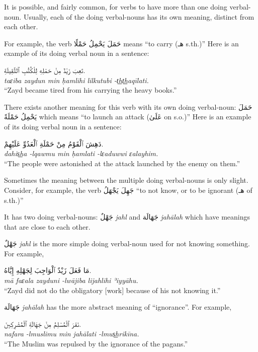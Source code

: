 \documentclass[
  10pt,
]{book}
\begin{document}
It is possible, and fairly common, for verbs to have more than one doing verbal-noun. Usually, each of the doing verbal-nouns has its own meaning, distinct from each other.

For example, the verb \foreignlanguage{arabic}{حَمَلَ يَحْمِلُ حَمْلًا} means \enquote{to carry (\foreignlanguage{arabic}{هـ} s.th.)} Here is an example of its doing verbal noun in a sentence:

\foreignlanguage{arabic}{تَعِبَ زَيْدٌ مِنْ حَمْلِهِ لِلْکُتُبِ ٱلثَّقِيلَةِ.}\\
\emph{taɛiba zaydun min ḥamlihi lilkutubi -t͟ht͟haqīlati.}\\
\enquote{Zayd became tired from his carrying the heavy books.}

There exists another meaning for this verb with its own doing verbal-noun: \foreignlanguage{arabic}{حَمَلَ يَحْمِلُ حَمْلَةً} which means \enquote{to launch an attack (\foreignlanguage{arabic}{عَلَىٰ} on s.o.)} Here is an example of its doing verbal noun in a sentence:

\foreignlanguage{arabic}{دَهِشَ ٱلْقَوْمُ مِنْ حَمْلَةِ ٱلْعَدُوِّ عَلَيْهِمْ.}\\
\emph{dahis͟ha -lqawmu min ḥamlati -lɛaduwwi ɛalayhim.}\\
\enquote{The people were astonished at the attack launched by the enemy on them.}

Sometimes the meaning between the multiple doing verbal-nouns is only slight. Consider, for example, the verb \foreignlanguage{arabic}{جَهِلَ يَجْهَلُ} \enquote{to not know, or to be ignorant (\foreignlanguage{arabic}{هـ} of s.th.)}

It has two doing verbal-nouns: \foreignlanguage{arabic}{جَهْلٌ} \emph{jahl} and \foreignlanguage{arabic}{جَهَالَة} \emph{jahālah} which have meanings that are close to each other.

\foreignlanguage{arabic}{جَهْلٌ} \emph{jahl} is the more simple doing verbal-noun used for not knowing something. For example,

\foreignlanguage{arabic}{مَا فَعَلَ زَيْدٌ ٱلْوَاجِبَ لِجَهْلِهِ إِيَّاهُ.}\\
\emph{mā faɛala zayduni -lwājiba lijahlihi ʾiyyāhu.}\\
\enquote{Zayd did not do the obligatory {[}work{]} because of his not knowing it.}

\foreignlanguage{arabic}{جَهَالَة} \emph{jahālah} has the more abstract meaning of \enquote{ignorance}. For example,

\foreignlanguage{arabic}{نَفَرَ ٱلْمُسْلِمُ مِنْ جَهَالَةِ ٱلْمُشْرِکِينَ.}\\
\emph{nafara -lmuslimu min jahālati -lmus͟hrikīna.}\\
\enquote{The Muslim was repulsed by the ignorance of the pagans.}
\end{document}
